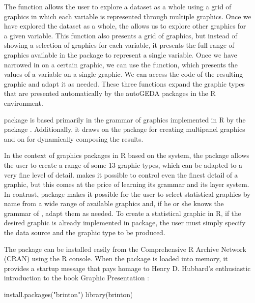 The  function allows the user to explore a dataset as a
whole using a grid of graphics in which each variable is represented
through multiple graphics. Once we have explored the dataset as a whole,
the  allows us to explore other graphics for a given
variable. This function also presents a grid of graphics, but instead of
showing a selection of graphics for each variable, it presents the full
range of graphics available in the package to represent a single
variable. Once we have narrowed in on a certain graphic, we can use the
 function, which presents the values of a variable on a
single graphic. We can access the code of the resulting graphic and
adapt it as needed. These three functions expand the graphic types that
are presented automatically by the autoGEDA packages in the R
environment.

 package is based primarily in the grammar of graphics
\citep{Wilkinson2005} implemented in R by the package
. Additionally, it draws on the package 
\citep{Auguie2017} for creating multipanel graphics and on
 \citep{Allaire2019} for dynamically composing the
results.

In the context of graphics packages in R based on the
 system, the package  allows the user to create a
range of some 13 graphic types, which can be adapted to a very fine
level of detail.  makes it possible to control even the
finest detail of a graphic, but this comes at the price of learning its
grammar and its layer system. In contrast,  package makes
it possible for the user to select statistical graphics by name from a
wide range of available graphics and, if he or she knows the grammar of
, adapt them as needed. To create a statistical graphic in
R, if the desired graphic is already implemented in
 package, the user must simply specify the data source and
the graphic type to be produced.

The package can be installed easily from the Comprehensive R Archive
Network (CRAN) using the R console. When the package is
loaded into memory, it provides a startup message that pays homage to
Henry D. Hubbard's enthusiastic introduction to the book Graphic
Presentation \citep{Brinton1939}:

\begin{example}
  install.packages("brinton")
  library(brinton)
\end{example}


